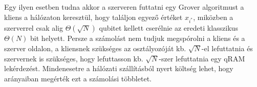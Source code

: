 \indent Egy ilyen esetben tudna akkor a szerveren futtatni egy Grover algoritmust a kliens a hálózaton keresztül, hogy találjon egyező értéket $x_{i^*}$, miközben a szerverrel csak alig $\Theta(\sqrt{N})$ qubitet kellett cserélnie az eredeti klasszikus $\Theta(N)$ bit helyett.
Persze a számolást nem tudjuk megspórolni a kliens és a szerver oldalon, a kliensnek szükséges az osztályozóját kb. $\sqrt{N}$-el lefuttatnia és szervernek is szükséges, hogy lefuttasson kb. $\sqrt{N}$-szer lefuttatnia egy qRAM lekérdezést.
Mindenesetre a hálózati szállításból nyert költség lehet, hogy arányaiban megérték ezt a számolási többletet.